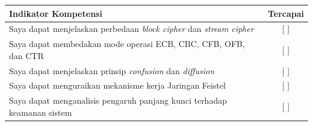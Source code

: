 \documentclass[../main.tex]{subfiles}
\begin{document}
\begin{competencychecklist}
\begin{tabularx}{\linewidth}{|X|c|}
\hline
Indikator Kompetensi & Tercapai \\
\hline
Saya dapat menjelaskan perbedaan \textit{block cipher} dan \textit{stream cipher} & [ ] \\
\hline
Saya dapat membedakan mode operasi ECB, CBC, CFB, OFB, dan CTR & [ ] \\
\hline
Saya dapat menjelaskan prinsip \textit{confusion} dan \textit{diffusion} & [ ] \\
\hline
Saya dapat menguraikan mekanisme kerja Jaringan Feistel & [ ] \\
\hline
Saya dapat menganalisis pengaruh panjang kunci terhadap keamanan sistem & [ ] \\
\hline
\end{tabularx}
\end{competencychecklist}
\end{document}
